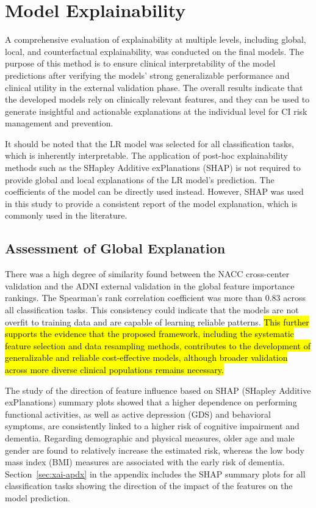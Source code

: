 \section{Model Explainability}
A comprehensive evaluation of explainability at multiple levels, including global, local, and counterfactual explainability, was conducted on the final models. The purpose of this method is to ensure clinical interpretability of the model predictions after verifying the models' strong generalizable performance and clinical utility in the external validation phase. The overall results indicate that the developed models rely on clinically relevant features, and they can be used to generate insightful and actionable explanations at the individual level for CI risk management and prevention. 

It should be noted that the LR model was selected for all classification tasks, which is inherently interpretable. The application of post-hoc explainability methods such as the SHapley Additive exPlanations (\acrshort{SHAP}) is not required to provide global and local explanations of the LR model's prediction. The coefficients of the model can be directly used instead. However, SHAP was used in this study to provide a consistent report of the model explanation, which is commonly used in the literature.

\subsection{Assessment of Global Explanation}
There was a high degree of similarity found between the NACC cross-center validation and the ADNI external validation in the global feature importance rankings. The Spearman’s rank correlation coefficient was more than 0.83 across all classification tasks. This consistency could indicate that the models are not overfit to training data and are capable of learning reliable patterns. \hl{This further supports the evidence that the proposed framework, including the systematic feature selection and data resampling methods, contributes to the development of generalizable and reliable cost-effective models, although broader validation across more diverse clinical populations remains necessary.}

The study of the direction of feature influence based on SHAP (SHapley Additive exPlanations) summary plots showed that a higher dependence on performing functional activities, as well as active depression (\acrshort{GDS}) and behavioral symptoms, are consistently linked to a higher risk of cognitive impairment and dementia. Regarding demographic and physical measures, older age and male gender are found to relatively increase the estimated risk, whereas the low body mass index (\acrshort{BMI}) measures are associated with the early risk of dementia. Section~\ref{sec:xai-apdx} in the appendix includes the SHAP summary plots for all classification tasks showing the direction of the impact of the features on the model prediction.

